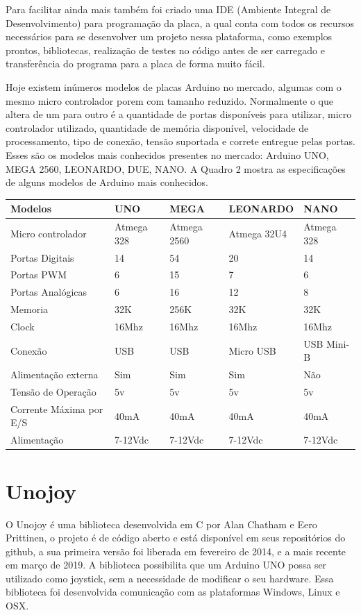 \documentclass[
	12pt,			%
	openright,		%
	oneside,			%
	a4paper,			%
	chapter=TITLE,		%
	english,			%
	brazil,			%
	]{abntex2}
\begin{document}
Para facilitar ainda mais também foi criado uma IDE (Ambiente Integral de Desenvolvimento) para programação da placa, a qual conta com todos os recursos necessários para se desenvolver um projeto nessa plataforma, como exemplos prontos, bibliotecas, realização de testes no código antes de ser carregado e transferência do programa para a placa de forma muito fácil.

Hoje existem inúmeros modelos de placas Arduino no mercado, algumas com o mesmo micro controlador porem com tamanho reduzido. Normalmente o que altera de um para outro é a quantidade de portas disponíveis para utilizar, micro controlador utilizado, quantidade de memória disponível, velocidade de processamento, tipo de conexão, tensão suportada e correte entregue pelas portas. Esses são os modelos mais conhecidos presentes no mercado: Arduino UNO, MEGA 2560, LEONARDO, DUE, NANO. A Quadro 2 mostra as especificações de alguns modelos de Arduino mais conhecidos.

{
\centering
\footnotesize
\begin{tabular}{|p{5cm}|p{2cm}|p{2cm}|p{3cm}|p{2cm}|}
\hline
\textbf{Modelos} & UNO & MEGA & LEONARDO & NANO \\
\hline
Micro controlador & Atmega 328 & Atmega 2560 & Atmega 32U4 & Atmega 328 \\
\hline
Portas Digitais & 14 & 54 & 20 & 14 \\
\hline
Portas PWM & 6 & 15 & 7 & 6 \\
\hline
Portas Analógicas & 6 & 16 & 12 & 8 \\
\hline
Memoria & 32K & 256K & 32K & 32K \\
\hline
Clock & 16Mhz & 16Mhz & 16Mhz & 16Mhz \\
\hline
Conexão & USB & USB & Micro USB & USB Mini-B \\
\hline
Alimentação externa & Sim & Sim & Sim & Não \\
\hline
Tensão de Operação & 5v & 5v & 5v & 5v \\
\hline
Corrente Máxima por E/S & 40mA & 40mA & 40mA & 40mA \\
\hline
Alimentação & 7-12Vdc & 7-12Vdc & 7-12Vdc & 7-12Vdc\\
\hline
\end{tabular}
}

\section{Unojoy}
 
O Unojoy é uma biblioteca desenvolvida em C por Alan Chatham e Eero Prittinen, o projeto é de código aberto e está disponível em seus repositórios do github, a sua primeira versão foi liberada em fevereiro de 2014, e a mais recente em março de 2019. A biblioteca possibilita que um Arduino UNO possa ser utilizado como joystick, sem a necessidade de modificar o seu hardware. Essa biblioteca foi desenvolvida comunicação com as plataformas Windows, Linux e OSX. 
\end{document}
